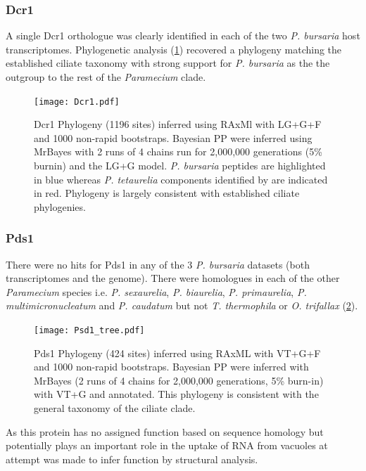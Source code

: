 \subsubsection{Dcr1}

A single Dcr1 orthologue was clearly identified in each of
the two \textit{P. bursaria} host transcriptomes.
Phylogenetic analysis (\cref{fig:dcr1}) recovered a phylogeny
matching the established ciliate taxonomy \citep{Aury2006,Fokin2004,Swart2013}
with strong support for \textit{P. bursaria} as the the outgroup to the rest of 
the \textit{Paramecium} clade. 

\begin{figure}
    \texttt{[image: Dcr1.pdf]}
    \caption[Dcr1 Phylogeny]{Dcr1 Phylogeny (1196 sites) inferred using RAxMl with
        LG+G+F and 1000 non-rapid bootstraps.  Bayesian PP 
        were inferred using MrBayes with 2 runs of 4 chains run for 2,000,000
        generations (5\% burnin) and the LG+G model.  \textit{P. bursaria} peptides
        are highlighted in blue whereas \textit{P. tetaurelia} components
    identified by \citep{Marker2014} are indicated in red.  Phylogeny
is largely consistent with established ciliate phylogenies.}
    \label{fig:dcr1}
\end{figure}


\subsubsection{Pds1}
There were no hits for Pds1 in any of the 3 \textit{P. bursaria} datasets 
(both transcriptomes and the genome).  
There were homologues in each of the other \textit{Paramecium} species
i.e. \textit{P. sexaurelia}, \textit{P. biaurelia}, \textit{P. primaurelia},
\textit{P. multimicronucleatum} and \textit{P. caudatum} but not
\textit{T. thermophila} or \textit{O. trifallax} (\cref{fig:pds1}).
\begin{figure}
    \texttt{[image: Psd1\_tree.pdf]}
    \caption[Pds1 Phylogeny]{Pds1 Phylogeny (424 sites) inferred
        using RAxML with VT+G+F and 1000 non-rapid bootstraps.  Bayesian
        PP were inferred with MrBayes (2 runs of 4 chains for 2,000,000 generations, 5\% burn-in) 
        with VT+G and annotated. This phylogeny is consistent with the general
    taxonomy of the ciliate clade.}
\label{fig:pds1}
\end{figure}

As this protein has no assigned function based on sequence homology
\citep{Marker2014,Carradec2015}
but potentially plays an important role in the uptake of RNA 
from vacuoles at attempt was made to infer 
function by structural analysis. 


